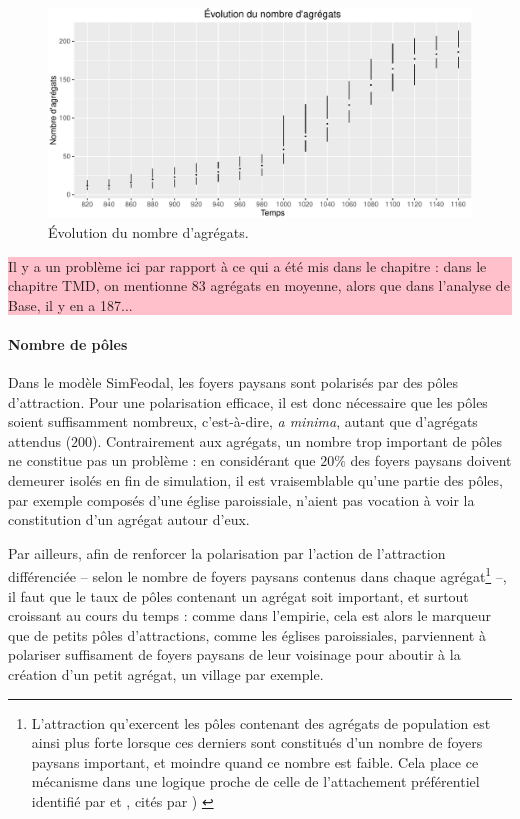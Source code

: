 \begin{figure}[H]
	\captionsetup{width=\linewidth}
	\includegraphics[width=\linewidth]{img/resultats/v0_nombre_agregats.pdf}
	\caption{Évolution du nombre d'agrégats.} 
	\label{fig:nombre-agregats-v0} 
\end{figure}

\colorbox{pink}{\parbox{0.9\textwidth}{%
		\vskip5pt
		Il y a un problème ici par rapport à ce qui a été mis dans le chapitre : dans le chapitre TMD, on mentionne 83 agrégats en moyenne, alors que dans l'analyse de Base, il y en a 187...
		\vskip5pt
	}
}	

\paragraph{Nombre de pôles}

Dans le modèle SimFeodal, les foyers paysans sont polarisés par des pôles d'attraction. Pour une polarisation efficace, il est donc nécessaire que les pôles soient suffisamment nombreux, c'est-à-dire, \textit{a minima}, autant que d'agrégats attendus ($200$). Contrairement aux agrégats, un nombre trop important de pôles ne constitue pas un problème : en considérant que $20\%$ des foyers paysans doivent demeurer isolés en fin de simulation, il est vraisemblable qu'une partie des pôles, par exemple composés d'une église paroissiale, n'aient pas vocation à voir la constitution d'un agrégat autour d'eux.

Par ailleurs, afin de renforcer la polarisation par l'action de l'attraction différenciée -- selon le nombre de foyers paysans contenus dans chaque agrégat\footnote{L'attraction qu'exercent les pôles contenant des agrégats de population est ainsi plus forte lorsque ces derniers sont constitués d'un nombre de foyers paysans important, et moindre quand ce nombre est faible. Cela place ce mécanisme dans une logique proche de celle de l'attachement préférentiel identifié par \autocite{yule1925ii} et  \autocite{simon1955class}, cités par \autocite[93]{schmitt_modelisation_2014-1}) \label{ftn:attachement-preferentiel}} --, il faut que le taux de pôles contenant un agrégat soit important, et surtout croissant au cours du temps : comme dans l'empirie, cela est alors le marqueur que de petits pôles d'attractions, comme les églises paroissiales, parviennent à polariser suffisament de foyers paysans de leur voisinage pour aboutir à la création d'un petit agrégat, un village par exemple.

